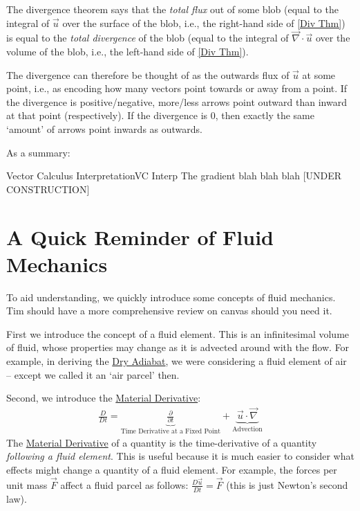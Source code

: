 The divergence theorem says that the \textit{total flux} out of some blob (equal to the integral of $\vec{u}$ over the surface of the blob, i.e., the right-hand side of \ref{Div Thm}) is equal to the \textit{total divergence} of the blob (equal to the integral of $\vec{\nabla}\cdot\vec{u}$ over the volume of the blob, i.e., the left-hand side of \ref{Div Thm}). 

The divergence can therefore be thought of as the outwards flux of $\vec{u}$ at some point, i.e., as encoding how many vectors point towards or away from a point. If the divergence is positive/negative, more/less arrows point outward than inward at that point (respectively). If the divergence is $0$, then exactly the same `amount' of arrows point inwards as outwards. 

As a summary:
\begin{fact}{Vector Calculus Interpretation}{VC Interp}\label{VC Interp}
    The gradient blah blah blah [UNDER CONSTRUCTION]
\end{fact}

\section{A Quick Reminder of Fluid Mechanics}

To aid understanding, we quickly introduce some concepts of fluid mechanics. Tim should have a more comprehensive review on canvas should you need it.

First we introduce the concept of a fluid element. This is an infinitesimal volume of fluid, whose properties may change as it is advected around with the flow. For example, in deriving the \hyperref[Dry Adiabat]{Dry Adiabat}, we were considering a fluid element of air – except we called it an `air parcel' then.

Second, we introduce the \hyperref[Material Derivative]{Material Derivative}:
\begin{align}
    \frac{D}{Dt}=\underbrace{\frac{\partial}{\partial t}}_{\text{Time Derivative at a Fixed Point}}+\underbrace{\vec{u}\cdot\vec{\nabla}}_{\text{Advection}}
    \label{Material Derivative}
\end{align}
The \hyperref[Material Derivative]{Material Derivative} of a quantity is the time-derivative of a quantity \textit{following a fluid element}. This is useful because it is much easier to consider what effects might change a quantity of a fluid element. For example, the forces per unit mass $\vec{F}$ affect a fluid parcel as follows: $\frac{D\vec{u}}{Dt}=\vec{F}$ (this is just Newton's second law).

